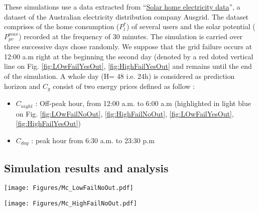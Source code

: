 \documentclass[conference]{IEEEtran}
\begin{document}
 These simulations use a data extracted from ``\href{https://www.ausgrid.com.au/Common/About-us/Corporate-information/Data-to-share/Solar-home-electricity-data.aspx}{Solar home electricity data}'', a dataset of the Australian electricity distribution company Ausgrid. The dataset comprises of the home consumption ($P_l^*$) of several users and the solar potential ($P^{max}_{pv}$) recorded at the frequency of 30 minutes. The simulation is carried over three successive days chose randomly. We suppose that the grid failure occurs at 12:00 a.m right at the beginning the second day (denoted by a red doted vertical line on Fig. \ref{fig:LOwFailYesOut}, \ref{fig:HighFailYesOut} and remains until the end of the simulation. A whole day (H= 48 i.e. 24h) is considered as prediction horizon and $C_{g}$ consist of two energy prices defined as follow : 
\begin{itemize}
 \item $C_{night}$ : Off-peak hour, from 12:00 a.m. to 6:00 a.m (highlighted in light blue on Fig. \ref{fig:LOwFailNoOut}, \ref{fig:HighFailNoOut}, \ref{fig:LOwFailYesOut}, \ref{fig:HighFailYesOut})
 \item $C_{day}$ : peak hour from 6:30 a.m. to 23:30 p.m
\end{itemize}

 
 \subsection{Simulation results and analysis}
 
 \begin{figure*}[!ht]
  
    \begin{minipage}{.49\linewidth}
       
        \texttt{[image: Figures/Mc\_LowFailNoOut.pdf]}
        \caption{Low prob of failure, No outage}
        \label{fig:LOwFailNoOut}    
    \end{minipage}%
    \begin{minipage}{.01\linewidth}
      \hspace{1px}
    \end{minipage}%
    \begin{minipage}{0.49\linewidth}
        \texttt{[image: Figures/Mc\_HighFailNoOut.pdf]}
        \caption{High prob of failure, no outage}
        \label{fig:HighFailNoOut}
    \end{minipage}
\end{figure*}
\end{document}
